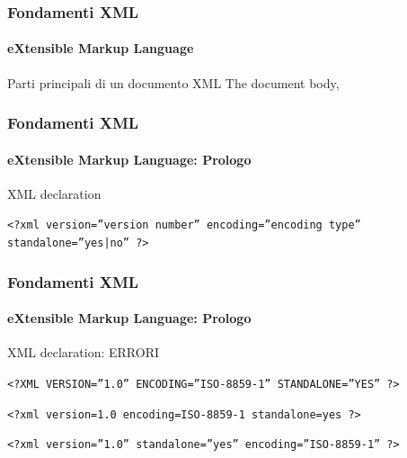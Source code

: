 \begin{frame}
	\frametitle{Fondamenti XML}
	\framesubtitle{eXtensible Markup Language}
	\addtocounter{nframe}{1}

	\begin{block}{Parti principali di un documento XML}
        The document body, %
	\end{block}

\end{frame}

\begin{frame}
	\frametitle{Fondamenti XML}
	\framesubtitle{eXtensible Markup Language: Prologo}
	\addtocounter{nframe}{1}

	\begin{block}{XML declaration}
    \begin{center}\texttt{<?xml version=”version number” encoding=”encoding type” standalone=”yes|no” ?>}\end{center}
	\end{block}

\end{frame}


\begin{frame}
	\frametitle{Fondamenti XML}
	\framesubtitle{eXtensible Markup Language: Prologo}
	\addtocounter{nframe}{1}

	\begin{block}{XML declaration: ERRORI}
	\begin{center}\texttt{<?XML VERSION=”1.0” ENCODING=”ISO-8859-1” STANDALONE=”YES” ?>}\end{center}
	\begin{center}\texttt{<?xml version=1.0 encoding=ISO-8859-1 standalone=yes ?>}\end{center}
	\begin{center}\texttt{<?xml version=”1.0” standalone=”yes” encoding=”ISO-8859-1” ?>}\end{center}
	\end{block}

\end{frame}

